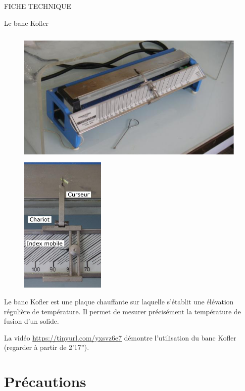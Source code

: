 



\begin{header}
FICHE TECHNIQUE

Le banc Kofler
\end{header}

\begin{figure}[h]
\begin{center}
\includegraphics[height=190pt]{images/banc_kofler.png}
\includegraphics[height=190pt]{images/banc_kofler_chariot.jpg}
\end{center}
\end{figure}

Le banc Kofler est une plaque chauffante sur laquelle s'établit une élévation régulière de température.
Il permet de mesurer précisément la température de fusion d'un solide.

La vidéo \href{https://tinyurl.com/yxsvz6e7}{https://tinyurl.com/yxsvz6e7} démontre l'utilisation du banc Kofler (regarder à partir de 2'17'').

\section*{Précautions}

